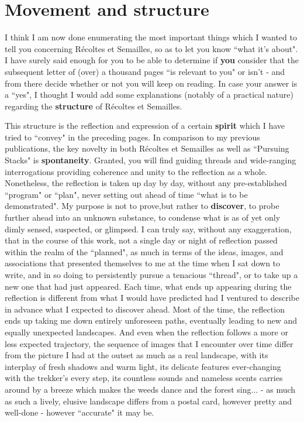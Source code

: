 \section{Movement and structure}

I think I am now done enumerating the most important things which I wanted to tell you concerning R\'ecoltes et Semailles, so as to let you know ``what it's about". I have surely said enough for you to be able to determine if \textbf{you} consider that the subsequent letter of (over) a thousand pages ``is relevant to you" or isn't - and from there decide whether or not you will keep on reading. In case your answer is a ``yes", I thought I would add some explanations (notably of a practical nature) regarding the \textbf{structure} of R\'ecoltes et Semailles.

This structure is the reflection and expression of a certain \textbf{spirit} which I have tried to ``convey" in the preceding pages. In comparison to my previous publications, the key novelty in both R\'ecoltes et Semailles as well as ``Pursuing Stacks" is \textbf{spontaneity}. Granted, you will find guiding threads and wide-ranging interrogations providing coherence and unity to the reflection as a whole. Nonetheless, the reflection is taken up day by day, without any pre-established ``program" or ``plan", never setting out ahead of time ``what is to be demonstrated". My purpose is not to prove,but rather to \textbf{discover}, to probe further ahead into an unknown substance, to condense what is as of yet only dimly sensed, suspected, or glimpsed. I can truly say, without any exaggeration, that in the course of this work, not a single day or night of reflection passed within the realm of the ``planned", as much in terms of the ideas, images, and associations that presented themselves to me at the time when I sat down to write, and in so doing to persistently pursue a tenacious ``thread", or to take up a new one that had just appeared. Each time, what ends up appearing during the reflection is different from what I would have predicted had I ventured to describe in advance what I expected to discover ahead. Most of the time, the reflection ends up taking me down entirely unforeseen paths, eventually leading to new and equally unexpected landscapes. And even when the reflection follows a more or less expected trajectory, the sequence of images that I encounter over time differ from the picture I had at the outset as much as a real landscape, with its interplay of fresh shadows and warm light, its delicate features ever-changing with the trekker's every step, its countless sounds and nameless scents carries around by a breeze which makes the weeds dance and the forest sing... - as much as such a lively, elusive landscape differs from a postal card, however pretty and well-done - however ``accurate" it may be.

